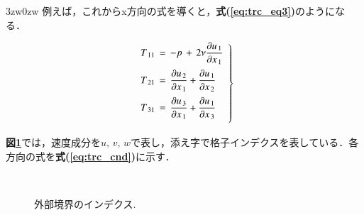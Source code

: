 \begin{indentation}{3zw}{0zw}
\noindent 例えば，これからx方向の式を導くと，\textbf{式(\ref{eq:trc_eq3})}のようになる．

\begin{equation}
\left .
\begin{array}{l}
\vspace{2mm}
\displaystyle{ T_{\,11} \,=\, -p \,+\, 2 \nu \frac{\partial u_{\,1}}{\partial x_{\,1}} }\\
\vspace{2mm}
\displaystyle{ T_{\,21} \,=\, \frac{\partial u_{\,2}}{\partial x_{\,1}} + \frac{\partial u_{\,1}}{\partial x_{\,2}} }\\
\vspace{2mm}
\displaystyle{ T_{\,31} \,=\, \frac{\partial u_{\,3}}{\partial x_{\,1}} + \frac{\partial u_{\,1}}{\partial x_{\,3}} } 
\end{array}
\right \}
\label{eq:trc_eq3}
\end{equation}

\noindent \textbf{図\ref{fig:x-trc}}では，速度成分を$u,\,v,\,w$で表し，添え字で格子インデクスを表している．各方向の式を\textbf{式(\ref{eq:trc_cnd})}に示す．


\begin{figure}[htbp]
\begin{center}
~
\caption{外部境界のインデクス.} 
\label{fig:x-trc}
\end{center}
\end{figure}






\end{indentation}
